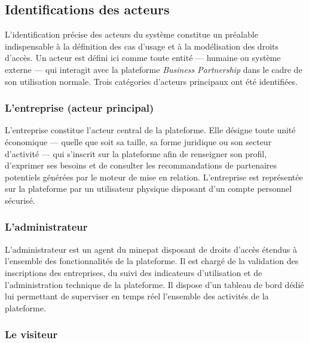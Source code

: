 \documentclass[12pt, a4paper, oneside]{report}
\begin{document}
	
	\subsection{Identifications des acteurs}
	L'identification précise des acteurs du système constitue un
	préalable indispensable à la définition des cas d'usage et à la
	modélisation des droits d'accès. Un acteur est défini ici comme
	toute entité --- humaine ou système externe --- qui interagit
	avec la plateforme \textit{Business Partnership} dans le cadre
	de son utilisation normale. Trois catégories d'acteurs principaux
	ont été identifiées.
	
	
	\subsubsection{L'entreprise (acteur principal)}
	
	L'entreprise constitue l'acteur central de la plateforme. Elle
	désigne toute unité économique --- quelle que soit sa taille,
	sa forme juridique ou son secteur d'activité --- qui s'inscrit
	sur la plateforme afin de renseigner son profil, d'exprimer
	ses besoins et de consulter les recommandations de partenaires
	potentiels générées par le moteur de mise en relation. L'entreprise
	est représentée sur la plateforme par un  utilisateur
	physique disposant d'un compte personnel sécurisé.
	
	\subsubsection{L'administrateur}
	
	L'administrateur est un agent du \gls{minepat} disposant de
	droits d'accès étendus à l'ensemble des fonctionnalités de la
	plateforme. Il est chargé de la validation des inscriptions des
	entreprises, du suivi
	des indicateurs d'utilisation et de l'administration technique
	de la plateforme. Il dispose d'un tableau de bord dédié lui
	permettant de superviser en temps réel l'ensemble des activités
	de la plateforme.
	
	\subsubsection{Le visiteur}
	
\end{document}
